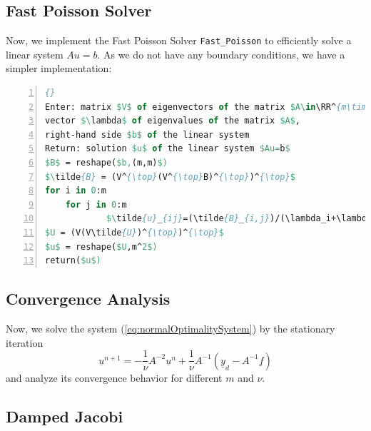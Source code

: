 \documentclass{amsart}
\theoremstyle{definition}
\theoremstyle{remark}
\numberwithin{equation}{section}
\newcommand{\RR}{\mathbb{R}}
\begin{document}

\subsection{Fast Poisson Solver}
Now, we implement the Fast Poisson Solver \texttt{Fast\_Poisson} to efficiently solve a linear system $Au=b$. As we do not have any boundary conditions, we have a simpler implementation:

\begin{lstlisting}[mathescape, language=Pascal, title=Fast\_Poisson,
frame=single, numbers=left, numberstyle=\tiny, tabsize=2,
morekeywords={Enter, Return, elif}, deletekeywords={of}, keywordstyle=\bfseries]{}
Enter: matrix $V$ of eigenvectors of the matrix $A\in\RR^{m\times m}$, 
vector $\lambda$ of eigenvalues of the matrix $A$, 
right-hand side $b$ of the linear system
Return: solution $u$ of the linear system $Au=b$
$B$ = reshape($b,(m,m)$)
$\tilde{B} = (V^{\top}(V^{\top}B)^{\top})^{\top}$
for i in 0:m
	for j in 0:m
			$\tilde{u}_{ij}=(\tilde{B}_{i,j})/(\lambda_i+\lambda_j)$
$U = (V(V\tilde{U})^{\top})^{\top}$
$u$ = reshape($U,m^2$)
return($u$)
\end{lstlisting}


\subsection{Convergence Analysis}
Now, we solve the system (\ref{eq:normalOptimalitySystem}) by the stationary iteration
\begin{equation}
\underline{u}^{n+1} = -\frac{1}{\nu} A^{-2}\underline{u}^n + \frac{1}{\nu} A^{-1} (\underline{y}_d-A^{-1}\underline{f})
\end{equation}
and analyze its convergence behavior for different $m$ and $\nu$.


\subsection{Damped Jacobi}

\end{document}
